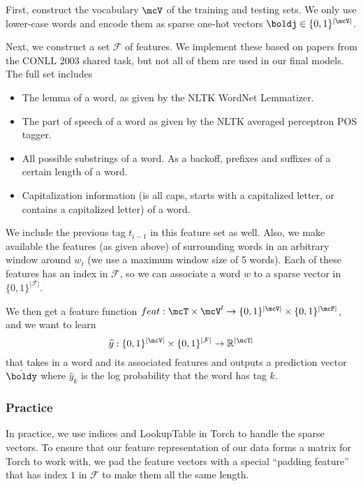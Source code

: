 \documentclass[11pt]{article}
\begin{document}
First, construct the vocabulary $\mcV$ of the training and testing sets. We only use lower-case words and encode them as sparse one-hot vectors $\boldj \in \{0,1\}^{|\mcV|}$.


Next, we construct a set $\mathcal{F}$ of features. We implement these based on papers from the CONLL 2003 shared task, but not all of them are used in our final models. The full set includes
\begin{itemize}
  \item The lemma of a word, as given by the NLTK WordNet Lemmatizer. 
  \item The part of speech of a word as given by the NLTK averaged perceptron POS tagger. 
  \item All possible substrings of a word.
\subitem As a backoff, prefixes and suffixes of a certain length of a word.
  \item Capitalization information (is all caps, starts with a capitalized letter, or contains a capitalized letter) of a word.
\end{itemize}

We include the previous tag $t_{i-1}$ in this feature set as well. Also, we make available the features (as given above) of surrounding words in an arbitrary window around $w_i$ (we use a maximum window size of 5 words). Each of these features has an index in $\mathcal{F}$, so we can associate a word $w$ to a sparse vector in $\{0,1\}^{|\mathcal{F}|}$.

We then get a feature function $feat : \mcT \times \mcV^l \to \{0,1\}^{|\mcV|} \times \{0, 1\}^{|\mcF|}$, and we want to learn
$$\widehat{y}: \{0,1\}^{|\mcV|} \times \{0,1\}^{|\mathcal{F}|} \to \mathbb{R}^{|\mcT|}$$
that takes in a word and its associated features and outputs a prediction vector $\hat{\boldy}$ where $\hat{y}_k$ is the log probability that the word has tag $k$. 

\subsubsection{Practice}

In practice, we use indices and LookupTable in Torch to handle the sparse vectors. To ensure that our feature representation of our data forms a matrix for Torch to work with, we pad the feature vectors with a special ``padding feature'' that has index $1$ in $\mathcal{F}$ to make them all the same length. 
\end{document}
